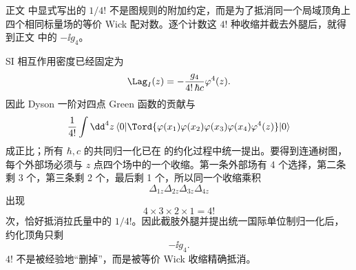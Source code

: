 \begin{derivation}[局域标量顶角的配对计数]

正文 中显式写出的 $1/4!$ 不是图规则的附加约定，而是为了抵消同一个局域顶角上四个相同标量场的等价 Wick 配对数。逐个计数这 $4!$ 种收缩并截去外腿后，就得到正文 中的 $-\ii g_4$。



SI 相互作用密度已经固定为
\begin{equation*}
 \Lag_I(z)=-\frac{g_4}{4!\,\hbar c}\varphi^4(z).
\end{equation*}
因此 Dyson 一阶对四点 Green 函数的贡献与
\begin{equation*}
 \frac{1}{4!}
 \int\dd^4 z\,
 \langle0|\Tord\{
 \varphi(x_1)\varphi(x_2)\varphi(x_3)\varphi(x_4)
 \varphi^4(z)
 \}|0\rangle
 \end{equation*}
成正比；所有 $\hbar,c$ 的共同归一化已在
的约化过程中统一提出。要得到连通树图，每个外部场必须与 $z$ 点四个场中的一个收缩。第一条外部场有 4 个选择，第二条剩 3 个，第三条剩 2 个，最后剩 1 个，所以同一个收缩乘积
\begin{equation*}
 \Delta_{1z}\Delta_{2z}\Delta_{3z}\Delta_{4z}
\end{equation*}
出现
\begin{equation*}
 4\times3\times2\times1=4!
\end{equation*}
次，恰好抵消拉氏量中的 $1/4!$。因此截肢外腿并提出统一国际单位制归一化后，约化顶角只剩
\begin{equation*}
 {-\ii g_4.}
\end{equation*}
$4!$ 不是被经验地“删掉”，而是被等价 Wick 收缩精确抵消。
\end{derivation}

